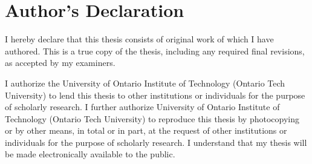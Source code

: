 \chapter*{Author's Declaration}


I hereby declare that this thesis consists of original work of which I have authored. This is a true copy of the thesis, including any required final revisions, as accepted by my examiners.


I authorize the University of Ontario Institute of Technology (Ontario Tech University) to lend this thesis to other institutions or individuals for the purpose of scholarly research. I further authorize University of Ontario Institute of Technology (Ontario Tech University) to reproduce this thesis by photocopying or by other means, in total or in part, at the request of other institutions or individuals for the purpose of scholarly research. I understand that my thesis will be made electronically available to the public.

\bigskip
\bigskip

\makeatletter\textbf{\@firstname\ {\@lastname}}\makeatother
